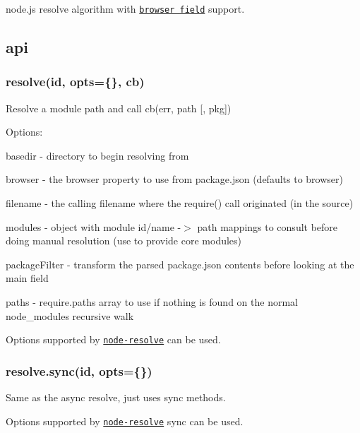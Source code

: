 node.\+js resolve algorithm with \href{https://github.com/defunctzombie/package-browser-field-spec}{\tt browser field} support.

\subsection*{api}

\subsubsection*{resolve(id, opts=\{\}, cb)}

Resolve a module path and call {\ttfamily cb(err, path \mbox{[}, pkg\mbox{]})}

Options\+:


\begin{DoxyItemize}
\item {\ttfamily basedir} -\/ directory to begin resolving from
\item {\ttfamily browser} -\/ the \textquotesingle{}browser\textquotesingle{} property to use from package.\+json (defaults to \textquotesingle{}browser\textquotesingle{})
\item {\ttfamily filename} -\/ the calling filename where the {\ttfamily require()} call originated (in the source)
\item {\ttfamily modules} -\/ object with module id/name -\/$>$ path mappings to consult before doing manual resolution (use to provide core modules)
\item {\ttfamily package\+Filter} -\/ transform the parsed {\ttfamily package.\+json} contents before looking at the {\ttfamily main} field
\item {\ttfamily paths} -\/ {\ttfamily require.\+paths} array to use if nothing is found on the normal {\ttfamily node\+\_\+modules} recursive walk
\end{DoxyItemize}

Options supported by \href{https://github.com/substack/node-resolve#resolveid-opts-cb}{\tt node-\/resolve} can be used.

\subsubsection*{resolve.\+sync(id, opts=\{\})}

Same as the async resolve, just uses sync methods.

Options supported by \href{https://github.com/substack/node-resolve#resolvesyncid-opts}{\tt node-\/resolve} {\ttfamily sync} can be used.

